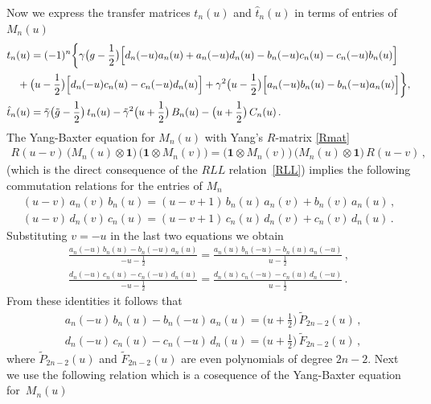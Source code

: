 \documentclass[a4paper,11pt]{article}
\numberwithin{equation}{section}
\begin{document}
Now we express the transfer matrices $t_n(u)$ and $\hat{t}_n(u)$ in terms of entries of~$M_n(u)$
\begin{align}
	& \nonumber
	t_n(u) = (-1)^n \biggl\{ \gamma \bigl(g-\frac{1}{2}\bigr) \Bigl[ d_n(-u)a_n(u) + a_n(-u)d_n(u) - b_n(-u)c_n(u) - c_n(-u)b_n(u) \Bigr] \\
	& \label{t_n_abcd} 
	\quad + \bigl(u-\frac{1}{2}\bigr)
	\Bigl[ d_n(-u)c_n(u) - c_n(-u)d_n(u) \Bigr] + \gamma^2 \bigl(u-\frac{1}{2}\bigr)\Bigl[ a_n(-u)b_n(u) - b_n(-u)a_n(u) \Bigr] \biggr\} ,
	\\ 	
	& \nonumber
	\hat{t}_n(u) = \tilde{\gamma} \bigl(\tilde{g} - \frac{1}{2} \bigr) \, t_n(u) - \tilde{\gamma}^2 \bigl(u + \frac{1}{2} \bigr) \,B_n(u) - \bigl(u + \frac{1}{2} \bigr) \,C_n(u) \,.
\end{align}	
The Yang-Baxter equation for $M_n(u)$ with Yang's $R$-matrix \eqref{Rmat} \cite{Fad:BetheAns,TaFa,Skl:VarSep,Skl91,KulSk}
\begin{align} \nonumber
	R(u-v)\, \bigl(M_n(u)\otimes \bm{1}\bigr)\,\bigl(\bm{1} \otimes M_n(v)\bigr) = 
	\bigl(\bm{1} \otimes M_n(v)\bigr)\,\bigl(M_n(u)\otimes \bm{1}\bigr)\, R(u-v) \,,
\end{align}
(which is the direct consequence of the $RLL$ relation~\eqref{RLL})
implies the following commutation relations for the entries of $M_n$
\begin{gather*}
	(u-v)\,a_n(v)\,b_n(u) = (u-v+1)\,b_n(u)\,a_n(v) + b_n(v)\,a_n(u) \,, \\
	(u-v)\,d_n(v)\,c_n(u) = (u-v+1)\,c_n(u)\,d_n(v) + c_n(v)\,d_n(u) \,.
\end{gather*}
Substituting $v=-u$ in the last two equations we obtain
\begin{gather*}
	\frac{a_n(-u)\,b_n(u) - b_n(-u)\,a_n(u)}{-u-\frac{1}{2}} = \frac{a_n(u)\,b_n(-u) - b_n(u)\,a_n(-u)}{u-\frac{1}{2}} \,, \\
	\frac{d_n(-u)\,c_n(u) - c_n(-u)\,d_n(u)}{-u-\frac{1}{2}} = \frac{d_n(u)\,c_n(-u) - c_n(u)\,d_n(-u)}{u-\frac{1}{2}} \,.
\end{gather*}
From these identities it follows that 
\begin{align*}
	& a_n(-u)\,b_n(u) - b_n(-u)\,a_n(u) = \bigl(u+\frac{1}{2}\bigr)\,\tilde{P}_{2n-2}(u)\,, \\
	& d_n(-u)\,c_n(u) - c_n(-u)\,d_n(u) = \bigl(u+\frac{1}{2}\bigr)\,\tilde{F}_{2n-2}(u) \,,
\end{align*}	
where $\tilde{P}_{2n-2}(u)$ and $\tilde{F}_{2n-2}(u)$ are even polynomials of degree $2n-2$.
Next we use the following relation which is a cosequence of the Yang-Baxter equation for~$M_n(u)$
\end{document}
